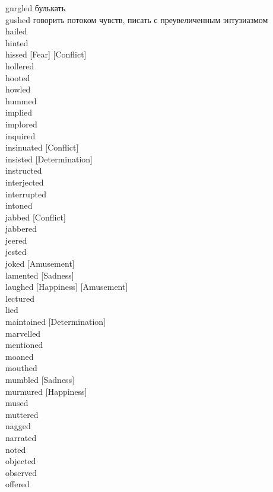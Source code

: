 \documentclass[a4paper,12pt,fleqn]{book}\usepackage{polyglossia}\setdefaultlanguage[babelshorthands=true]{russian}\setotherlanguage{english}\defaultfontfeatures{Ligatures=TeX,Mapping=tex-text}\usepackage{xcolor}\newcommand{\ml}[3]{#2}
\begin{document}
{gurgled \hfill булькать\\
gushed \hfill говорить потоком чувств, писать с преувеличенным энтузиазмом\\
hailed \hfill \\
hinted \hfill \\
hissed [Fear] [Conflict] \hfill \\
hollered \hfill \\
hooted \hfill \\
howled \hfill \\
hummed \hfill \\
implied \hfill \\
implored \hfill \\
inquired \hfill \\
insinuated [Conflict] \hfill \\
insisted [Determination] \hfill \\
instructed \hfill \\
interjected \hfill \\
interrupted \hfill \\
intoned \hfill \\
jabbed [Conflict] \hfill \\
jabbered \hfill \\
jeered \hfill \\
jested \hfill \\
joked [Amusement] \hfill \\
lamented [Sadness] \hfill \\
laughed [Happiness] [Amusement] \hfill \\
lectured \hfill \\
lied \hfill \\
maintained [Determination] \hfill \\
marvelled \hfill \\
mentioned \hfill \\
moaned \hfill \\
mouthed \hfill \\
mumbled [Sadness] \hfill \\
murmured [Happiness] \hfill \\
mused \hfill \\
muttered \hfill \\
nagged \hfill \\
narrated \hfill \\
noted \hfill \\
objected \hfill \\
observed \hfill \\
offered \hfill \\
}
\end{document}
